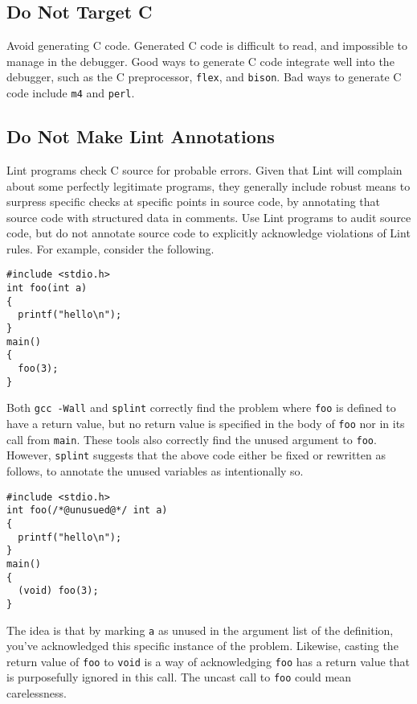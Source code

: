 \documentclass{lulu}
\newcommand{\code}[1]{\texttt{#1}\xspace}
\begin{document}
\subsection{Do Not Target C}

Avoid generating C code.  Generated C code is difficult to read, and
impossible to manage in the debugger.  Good ways to generate C code
integrate well into the debugger, such as the C preprocessor,
\code{flex}, and \code{bison}.  Bad ways to generate C code include
\code{m4} and \code{perl}.

\subsection{Do Not Make Lint Annotations} 

Lint programs check C source for probable errors.  Given that Lint
will complain about some perfectly legitimate programs, they generally
include robust means to surpress specific checks at specific points in
source code, by annotating that source code with structured data in
comments.  Use Lint programs to audit source code, but do not annotate
source code to explicitly acknowledge violations of Lint rules.  For
example, consider the following.

\begin{samepage}
\begin{verbatim}
#include <stdio.h>
int foo(int a)
{
  printf("hello\n");
}
main()
{
  foo(3);
}
\end{verbatim}
\end{samepage}

Both \code{gcc -Wall} and \code{splint} correctly find the problem
where \code{foo} is defined to have a return value, but no return
value is specified in the body of \code{foo} nor in its call from
\code{main}.  These tools also correctly find the unused argument to
\code{foo}.  However, \code{splint} suggests that the above code
either be fixed or rewritten as follows, to annotate the unused
variables as intentionally so.

\begin{samepage}
\begin{verbatim}
#include <stdio.h>
int foo(/*@unusued@*/ int a)
{
  printf("hello\n");
}
main()
{
  (void) foo(3);
}
\end{verbatim}
\end{samepage}

The idea is that by marking \code{a} as unused in the argument list of
the definition, you've acknowledged this specific instance of the
problem.  Likewise, casting the return value of \code{foo} to
\code{void} is a way of acknowledging \code{foo} has a return value
that is purposefully ignored in this call.  The uncast call to
\code{foo} could mean carelessness.
\end{document}
